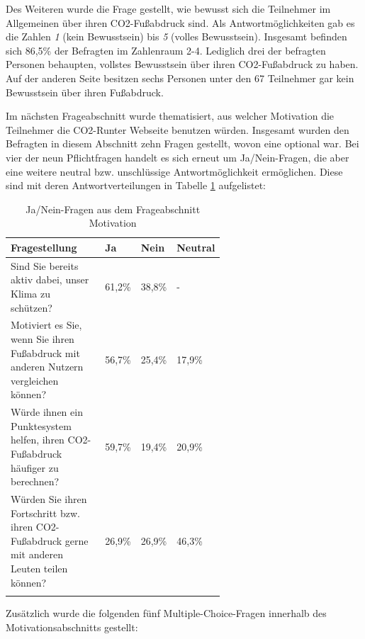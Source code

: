 Des Weiteren wurde die Frage gestellt, wie bewusst sich die Teilnehmer im Allgemeinen über ihren CO2-Fußabdruck sind.
Als Antwortmöglichkeiten gab es die Zahlen \textit{1} (kein Bewusstsein) bis \textit{5} (volles Bewusstsein).
Insgesamt befinden sich 86,5\% der Befragten im Zahlenraum 2-4.
Lediglich drei der befragten Personen behaupten, vollstes Bewusstsein über ihren CO2-Fußabdruck zu haben.
Auf der anderen Seite besitzen sechs Personen unter den 67 Teilnehmer gar kein Bewusstsein über ihren Fußabdruck.

Im nächsten Frageabschnitt wurde thematisiert, aus welcher Motivation die Teilnehmer die CO2-Runter Webseite benutzen würden.
Insgesamt wurden den Befragten in diesem Abschnitt zehn Fragen gestellt, wovon eine optional war.
Bei vier der neun Pflichtfragen handelt es sich erneut um Ja/Nein-Fragen, die aber eine weitere neutral bzw. unschlüssige Antwortmöglichkeit ermöglichen.
Diese sind mit deren Antwortverteilungen in Tabelle \ref{motivationFragen} aufgelistet:

\begin{longtable}{|p{0.6\linewidth}|l|l|l|}
    \hline
    \textbf{Fragestellung}                                                                         & \textbf{Ja} & \textbf{Nein} & \textbf{Neutral} \\ \hline
    \endfirsthead

    \endlastfoot

    Sind Sie bereits aktiv dabei, unser Klima zu schützen?                                         & 61,2\%      & 38,8\%        & -                \\ \hline
    Motiviert es Sie, wenn Sie ihren Fußabdruck mit anderen Nutzern vergleichen können?            & 56,7\%      & 25,4\%        & 17,9\%           \\ \hline
    Würde ihnen ein Punktesystem helfen, ihren CO2-Fußabdruck häufiger zu berechnen?               & 59,7\%      & 19,4\%        & 20,9\%           \\ \hline
    Würden Sie ihren Fortschritt bzw. ihren CO2-Fußabdruck gerne mit anderen Leuten teilen können? & 26,9\%      & 26,9\%        & 46,3\%           \\ \hline
    \caption{Ja/Nein-Fragen aus dem Frageabschnitt Motivation}
    \label{motivationFragen}
    \\
\end{longtable}

Zusätzlich wurde die folgenden fünf Multiple-Choice-Fragen innerhalb des Motivationsabschnitts gestellt:

